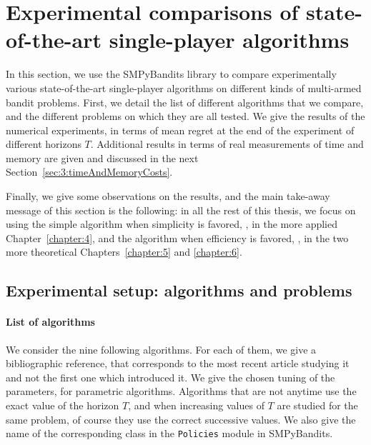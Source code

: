 \section{Experimental comparisons of state-of-the-art single-player algorithms}
\label{sec:3:reviewSPAlgorithms}


In this section, we use the SMPyBandits library to compare experimentally various state-of-the-art single-player algorithms on different kinds of multi-armed bandit problems.
First, we detail the list of different algorithms that we compare, and the different problems on which they are all tested.
We give the results of the numerical experiments, in terms of mean regret at the end of the experiment of different horizons $T$.
Additional results in terms of real measurements of time and memory are given and discussed in the next Section~\ref{sec:3:timeAndMemoryCosts}.

Finally, we give some observations on the results, and the main take-away message of this section is the following: in all the rest of this thesis, we focus on using the simple \UCB{} algorithm when simplicity is favored, \ie, in the more applied Chapter~\ref{chapter:4}, and the \klUCB{} algorithm when efficiency is favored, \ie, in the two more theoretical Chapters~\ref{chapter:5} and \ref{chapter:6}.


\subsection{Experimental setup: algorithms and problems}

\paragraph{List of algorithms}

We consider the nine following algorithms. For each of them, we give a bibliographic reference, that corresponds to the most recent article studying it and not the first one which introduced it.
We give the chosen tuning of the parameters, for parametric algorithms.
Algorithms that are not anytime use the exact value of the horizon $T$, and when increasing values of $T$ are studied for the same problem, of course they use the correct successive values.
We also give the name of the corresponding class in the \texttt{Policies} module in SMPyBandits.

